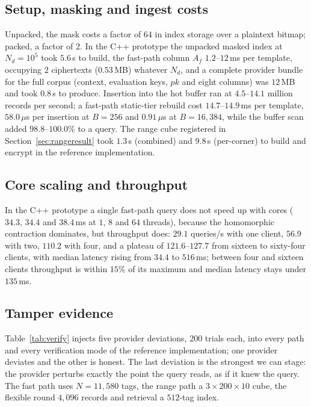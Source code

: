 \documentclass[a4paper,fleqn]{cas-sc}
\newif\ifauthorchecks
\newcommand{\authorcheck}[1]{\ifauthorchecks{\color{red}\textsf{[Authors: #1]}}\fi}
\begin{document}
\subsection{Setup, masking and ingest costs}
\label{sec:setupresult}
Unpacked, the mask costs a factor of $64$ in index storage over a plaintext
bitmap; packed, a factor of $2$. In the C++ prototype the unpacked masked index
at $N_d=10^5$ took $5.6$\,s to build, the fast-path column $A_f$ $1.2$--$12$\,ms
per template, occupying $2$ ciphertexts ($0.53$\,MB) whatever $N_d$, and a
complete provider bundle for the full corpus (context, evaluation keys, $pk$
and eight columns) was $12$\,MB and took $0.8$\,s to produce. Insertion into the hot
buffer ran at $4.5$--$14.1$ million records per second; a fast-path static-tier
rebuild cost $14.7$--$14.9$\,ms per template, $58.0\,\mu$s per insertion at
$B=256$ and $0.91\,\mu$s at $B=16{,}384$, while the buffer scan added
$98.8$--$100.0\%$ to a query. The range cube registered in
Section~\ref{sec:rangeresult} took $1.3$\,s (combined) and $9.8$\,s
(per-corner) to build and encrypt in the reference implementation.
\authorcheck{Re-measure the masked-index build with rejection sampling and
packing in C++.}

\subsection{Core scaling and throughput}
\label{sec:scaling}
In the C++ prototype a single fast-path query does not speed up with cores
($34.3$, $34.4$ and $38.4$\,ms at $1$, $8$ and $64$ threads), because the
homomorphic contraction dominates, but throughput does: $29.1$ queries/s with
one client, $56.9$ with two, $110.2$ with four, and a plateau of
$121.6$--$127.7$ from sixteen to sixty-four clients, with median latency rising
from $34.4$ to $516$\,ms; between four and sixteen clients throughput is within
$15\%$ of its maximum and median latency stays under $135$\,ms.

\subsection{Tamper evidence}
\label{sec:verifyresult}
Table~\ref{tab:verify} injects five provider deviations, $200$ trials each, into
every path and every verification mode of the reference implementation; one
provider deviates and the other is honest. The last deviation is the strongest
we can stage: the provider perturbs exactly the point the query reads, as if it
knew the query. The fast path uses $N=11{,}580$ tags, the range path a
$3\times200\times10$ cube, the flexible round $4{,}096$ records and retrieval a
$512$-tag index.
\end{document}
